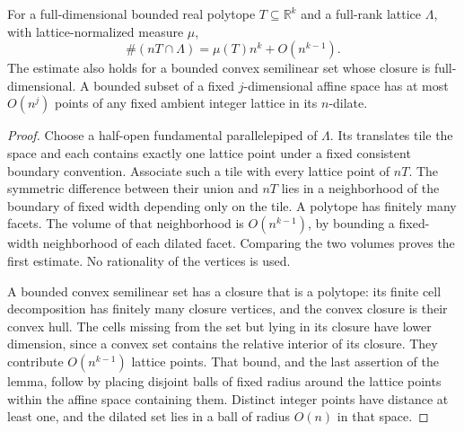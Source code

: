 \documentclass[11pt,a4paper]{article}
\numberwithin{equation}{section}
\theoremstyle{plain}
\newcommand{\R}{\mathbb R}
\begin{document}
\begin{lemma}\label{poly:ehr:lem:volume}
For a full-dimensional bounded real polytope $T\subseteq\R^k$ and a
full-rank lattice $\Lambda$, with lattice-normalized measure $\mu$,
\[
 \#(nT\cap\Lambda)=\mu(T)n^k+O(n^{k-1}).
\]
The estimate also holds for a bounded convex semilinear set whose closure
is full-dimensional. A bounded subset of a fixed $j$-dimensional affine
space has at most $O(n^j)$ points of any fixed ambient integer lattice in
its $n$-dilate.
\end{lemma}
\begin{proof}
Choose a half-open fundamental parallelepiped of $\Lambda$. Its translates
tile the space and each contains exactly one lattice point under a fixed
consistent boundary convention. Associate such a tile with every lattice
point of $nT$. The symmetric difference between their union and $nT$ lies
in a neighborhood of the boundary of fixed width depending only on the
tile. A polytope has finitely many facets. The volume of that neighborhood
is $O(n^{k-1})$, by bounding a fixed-width neighborhood of each dilated
facet. Comparing the two volumes proves the first estimate. No rationality
of the vertices is used.

A bounded convex semilinear set has a closure that is a polytope: its finite
cell decomposition has finitely many closure vertices, and the convex
closure is their convex hull. The cells missing from the set but lying in
its closure have lower dimension, since a convex set contains the relative
interior of its closure. They contribute $O(n^{k-1})$ lattice points.
That bound, and the last assertion of the lemma, follow by placing disjoint
balls of fixed radius around the lattice points within the affine space
containing them. Distinct integer points have distance at least one, and
the dilated set lies in a ball of radius $O(n)$ in that space.
\end{proof}
\end{document}
